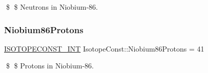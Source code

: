 \$ \$ Neutrons in Niobium-\/86. \mbox{\label{group___isotope_const-_niobium-_nb86_gadd1e81b69c1e67f63e9b5a6478d6ef8c}} 
\subsubsection{\texorpdfstring{Niobium86\+Protons}{Niobium86Protons}}
{\footnotesize\ttfamily \mbox{\hyperlink{group___isotope_const-_macros_ga5f18360b3e99483a35c32d789e62621c}{I\+S\+O\+T\+O\+P\+E\+C\+O\+N\+S\+T\+\_\+\+I\+NT}} Isotope\+Const\+::\+Niobium86\+Protons = 41}

\$ \$ Protons in Niobium-\/86. 